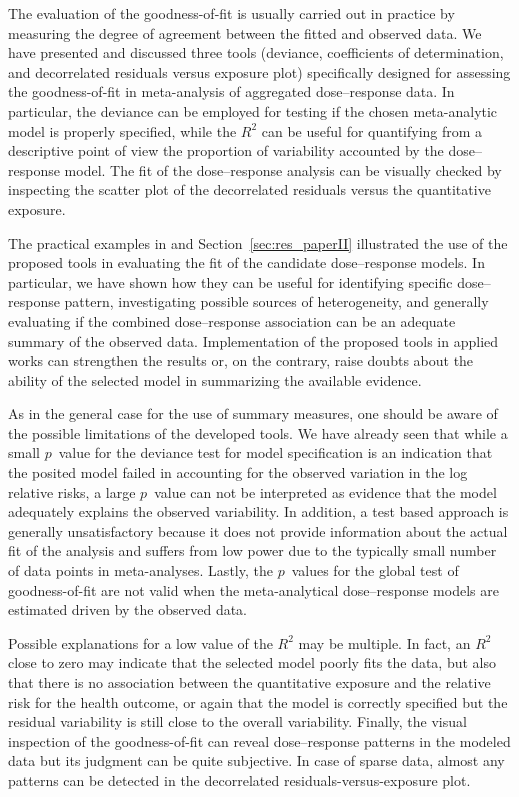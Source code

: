 \documentclass[11pt,a4paper,twoside,openany]{book}\usepackage{knitr}
\begin{document}
{{The evaluation of the goodness-of-fit is usually carried out in practice by measuring the degree of agreement between the fitted and observed data. We have presented and discussed three tools (deviance, coefficients of determination, and decorrelated residuals versus exposure plot) specifically designed for assessing the goodness-of-fit in meta-analysis of aggregated dose--response data. In particular, the deviance can be employed for testing if the chosen meta-analytic model is properly specified, while the $R^2$ can be useful for quantifying from a descriptive point of view the proportion of variability accounted by the dose--response model. The fit of the dose--response analysis can be visually checked by inspecting the scatter plot of the decorrelated residuals versus the quantitative exposure.

The practical examples in  and Section~\ref{sec:res_paperII} illustrated the use of the proposed tools in evaluating the fit of the candidate dose--response models. In particular, we have shown how they can be useful for identifying specific dose--response pattern, investigating possible sources of heterogeneity, and generally evaluating if the combined dose--response association can be an adequate summary of the observed data. Implementation of the proposed tools in applied works can strengthen the results or, on the contrary, raise doubts about the ability of the selected model in summarizing the available evidence. 

As in the general case for the use of summary measures, one should be aware of the possible limitations of the developed tools.
We have already seen that while a small $p$~value for the deviance test for model specification is an indication that the posited model failed in accounting for the observed variation in the log relative risks, a large $p$~value can not be interpreted as evidence that the model adequately explains the observed variability. In addition, a test based approach is generally unsatisfactory because it does not provide information about the actual fit of the analysis and suffers from low power due to the typically small number of data points in meta-analyses. Lastly, the $p$~values for the global test of goodness-of-fit are not valid when the meta-analytical dose--response models are estimated driven by the observed data.

Possible explanations for a low value of the $R^2$ may be multiple. In fact, an $R^2$ close to zero may indicate that the selected model poorly fits the data, but also that there is no association between the quantitative exposure and the relative risk for the health outcome, or again that the model is correctly specified but the residual variability is still close to the overall variability. Finally, the visual inspection of the goodness-of-fit can reveal dose--response patterns in the modeled data but its judgment can be quite subjective. In case of sparse data, almost any patterns can be detected in the decorrelated residuals-versus-exposure plot.

}}
\end{document}
